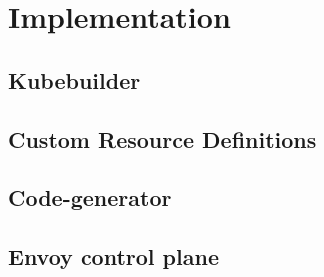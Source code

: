 \chapter{Implementation}

\section{Kubebuilder}

\section{Custom Resource Definitions}

\section{Code-generator}

\section{Envoy control plane}
